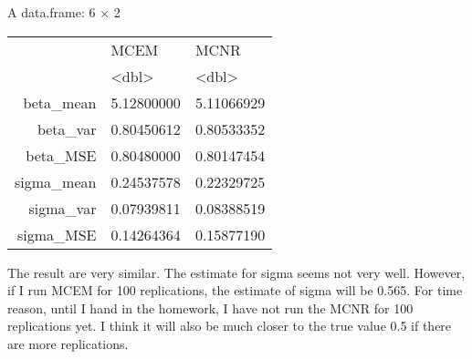 \documentclass[11pt]{article}
\begin{document}
    A data.frame: 6 × 2
\begin{tabular}{r|ll}
  & MCEM & MCNR\\
  & <dbl> & <dbl>\\
\hline
	beta\_mean & 5.12800000 & 5.11066929\\
	beta\_var & 0.80450612 & 0.80533352\\
	beta\_MSE & 0.80480000 & 0.80147454\\
	sigma\_mean & 0.24537578 & 0.22329725\\
	sigma\_var & 0.07939811 & 0.08388519\\
	sigma\_MSE & 0.14264364 & 0.15877190\\
\end{tabular}


    
    The result are very similar. The estimate for sigma seems not very well.
However, if I run MCEM for 100 replications, the estimate of sigma will
be 0.565. For time reason, until I hand in the homework, I have not run
the MCNR for 100 replications yet. I think it will also be much closer
to the true value 0.5 if there are more replications.


    
    
    
\end{document}

